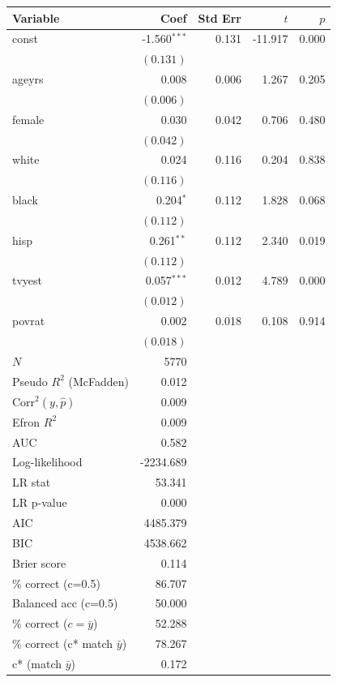 \renewcommand{\arraystretch}{1.1}
\setlength{\tabcolsep}{6pt}
\begin{table}[H]
\centering
\begin{tabular}{lrrrr}
\hline
Variable & Coef & Std Err & $t$ & $p$ \\
\hline
const & -1.560$^{\ast\ast\ast}$ & 0.131 & -11.917 & 0.000 \\
 & $(0.131)$ & & & \\
ageyrs & 0.008 & 0.006 & 1.267 & 0.205 \\
 & $(0.006)$ & & & \\
female & 0.030 & 0.042 & 0.706 & 0.480 \\
 & $(0.042)$ & & & \\
white & 0.024 & 0.116 & 0.204 & 0.838 \\
 & $(0.116)$ & & & \\
black & 0.204$^{\ast}$ & 0.112 & 1.828 & 0.068 \\
 & $(0.112)$ & & & \\
hisp & 0.261$^{\ast\ast}$ & 0.112 & 2.340 & 0.019 \\
 & $(0.112)$ & & & \\
tvyest & 0.057$^{\ast\ast\ast}$ & 0.012 & 4.789 & 0.000 \\
 & $(0.012)$ & & & \\
povrat & 0.002 & 0.018 & 0.108 & 0.914 \\
 & $(0.018)$ & & & \\
\hline
$N$ & 5770 & & & \\
Pseudo $R^2$ (McFadden) & 0.012 & & & \\
Corr$^2(y,\hat p)$ & 0.009 & & & \\
Efron $R^2$ & 0.009 & & & \\
AUC & 0.582 & & & \\
Log-likelihood & -2234.689 & & & \\
LR stat & 53.341 & & & \\
LR p-value & 0.000 & & & \\
AIC & 4485.379 & & & \\
BIC & 4538.662 & & & \\
Brier score & 0.114 & & & \\
\% correct (c=0.5) & 86.707 & & & \\
Balanced acc (c=0.5) & 50.000 & & & \\
\% correct ($c=\bar{y}$) & 52.288 & & & \\
\% correct (c* match $\bar{y}$) & 78.267 & & & \\
c* (match $\bar{y}$) & 0.172 & & & \\
\hline
\end{tabular}
\end{table}
